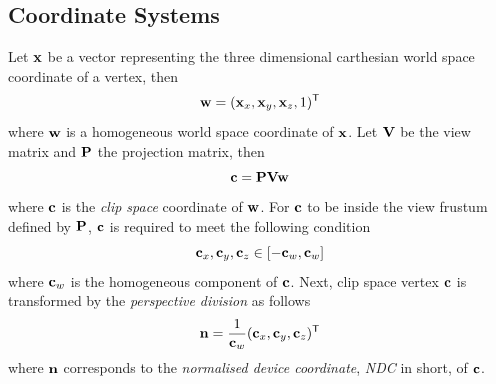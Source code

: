
\subsection{Coordinate Systems}
\label{sec:coordinate_systems}
Let $\mathbf{x}$ be a vector representing the three dimensional carthesian
world space coordinate of a vertex, then
\begin{equation}
 \mathbf{w} = (\mathbf{x}_x, \mathbf{x}_y, \mathbf{x}_z, 1)^{\mathsf{T}}
\end{equation}
where $\mathbf{w}$ is a homogeneous world space coordinate of $\mathbf{x}$.
Let $\mathbf{V}$ be the view matrix and $\mathbf{P}$ the projection matrix, then
\begin{equation}
\label{eq:ws_to_cs}
 \mathbf{c} = \mathbf{P} \mathbf{V} \mathbf{w}
\end{equation}
where $\mathbf{c}$ is the \textit{clip space} coordinate of $\mathbf{w}$. For $\mathbf{c}$ to
be inside the view frustum defined by $\mathbf{P}$, $\mathbf{c}$ is required to
meet the following condition
\begin{equation}
\label{eq:cs_bounds}
 \mvecx{c}, \mvecy{c}, \mvecz{c} \in \interval{-\mvecw{c}}{\mvecw{c}}
\end{equation}
where $\mathbf{c}_w$ is the homogeneous component of $\mathbf{c}$. Next, clip space
vertex $\mathbf{c}$ is transformed by the \textit{perspective division} as follows
\begin{equation}
\label{eq:cs_to_ndc}
 \mathbf{n} = \frac{1}{\mathbf{c}_w}(\mathbf{c}_x, \mathbf{c}_y, \mathbf{c}_z)^{\mathsf{T}}
\end{equation}
where $\mathbf{n}$ corresponds to the \textit{normalised device coordinate},
\textit{NDC} in short, of $\mathbf{c}$.
%
%
